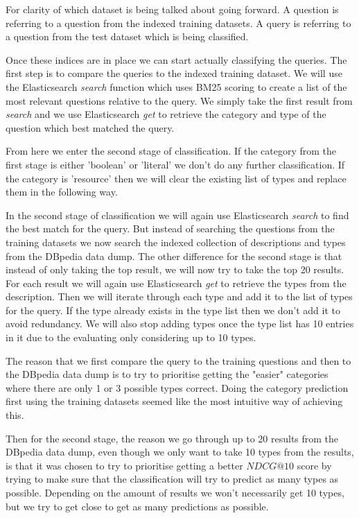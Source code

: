 \documentclass[sigconf]{acmart}
\begin{document}
\hfill \break
For clarity of which dataset is being talked about going forward. A question is referring to a question from the indexed training datasets. A query is referring to a question from the test dataset which is being classified. 
\hfill \break

Once these indices are in place we can start actually classifying the queries. The first step is to compare the queries to the indexed training dataset. We will use the Elasticsearch \emph{search} function which uses BM25 scoring to create a list of the most relevant questions relative to the query. We simply take the first result from \emph{search} and we use Elasticsearch \emph{get} to retrieve the category and type of the question which best matched the query.

From here we enter the second stage of classification. If the category from the first stage is either 'boolean' or 'literal' we don't do any further classification. If the category is 'resource' then we will clear the existing list of types and replace them in the following way.

In the second stage of classification we will again use Elasticsearch \emph{search} to find the best match for the query. But instead of searching the questions from the training datasets we now search the indexed collection of descriptions and types from the DBpedia data dump. The other difference for the second stage is that instead of only taking the top result, we will now try to take the top 20 results. For each result we will again use Elasticsearch \emph{get} to retrieve the types from the description. Then we will iterate through each type and add it to the list of types for the query. If the type already exists in the type list then we don't add it to avoid redundancy. We will also stop adding types once the type list has 10 entries in it due to the evaluating only considering up to 10 types. 

\hfill \break

The reason that we first compare the query to the training questions and then to the DBpedia data dump is to try to prioritise getting the "easier" categories where there are only 1 or 3 possible types correct. Doing the category prediction first using the training datasets seemed like the most intuitive way of achieving this. 

Then for the second stage, the reason we go through up to 20 results from the DBpedia data dump, even though we only want to take 10 types from the results, is that it was chosen to try to prioritise getting a better $NDCG@10$ score by trying to make sure that the classification will try to predict as many types as possible. Depending on the amount of results we won't necessarily get 10 types, but we try to get close to get as many predictions as possible.
\end{document}
